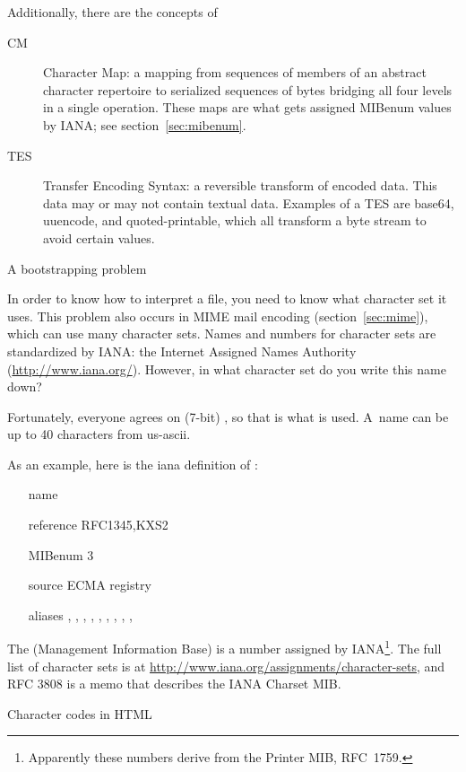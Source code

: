 Additionally, there are the concepts of
\begin{description}
\item[CM] Character Map: a mapping from sequences of members of an
  abstract character repertoire to serialized sequences of bytes
  bridging all four levels in a single operation. These maps are what
  gets assigned MIBenum values by IANA; see section~\ref{sec:mibenum}.
\item[TES] Transfer Encoding Syntax: a reversible transform of encoded
  data. This data may or may not contain textual data. Examples of a
  TES are base64, uuencode, and quoted-printable, which all transform
  a byte stream to avoid certain values.
\end{description}

 {A bootstrapping problem}
\label{sec:mibenum}

In order to know how to interpret a file, you need to know what
character set it uses. This problem also occurs in MIME mail encoding
(section~\ref{sec:mime}), which can use many character sets.  Names
and numbers for character sets are standardized by IANA:
the Internet Assigned Names Authority
(\url{http://www.iana.org/}). However, in what character set do you
write this name down?

Fortunately, everyone agrees on (7-bit) \ascii, so that is what is
used. A~name can be up to 40 characters from us-ascii.

As an example, here is the iana definition of \ascii:
\begin{itemize}
\item[name] 
\item[reference] RFC1345,KXS2
\item[MIBenum] 3
\item[source] ECMA registry
\item[aliases] , , ,
  , , ,
  , , , 
\end{itemize}
The  (Management Information Base) is a number assigned by
IANA\footnote{Apparently these numbers derive from the Printer MIB, RFC~1759.}.
The full list of character sets is at
\url{http://www.iana.org/assignments/character-sets},
and RFC 3808 is a memo that describes the IANA Charset MIB.

 {Character codes in HTML}

